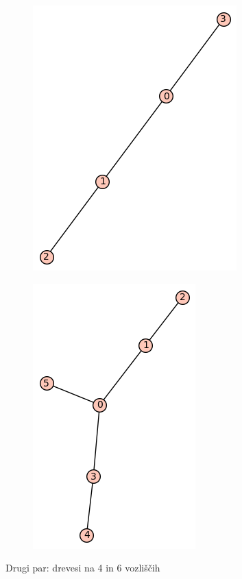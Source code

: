 \documentclass[12pt, a4paper]{article}
\begin{document}
\begin{center}
\begin{figure}[!htb]
\centering
\begin{subfigure}{0.5\textwidth}
  \centering
  \includegraphics[width=0.35\linewidth]{t-3}
\end{subfigure}%
\begin{subfigure}{0.5\textwidth}
  \centering
  \includegraphics[width=0.35\linewidth]{t-11}
\end{subfigure}
\caption{Drugi par: drevesi na 4 in 6 vozliščih}
\label{fig:test}
\end{figure}
\end{center}
\end{document}
